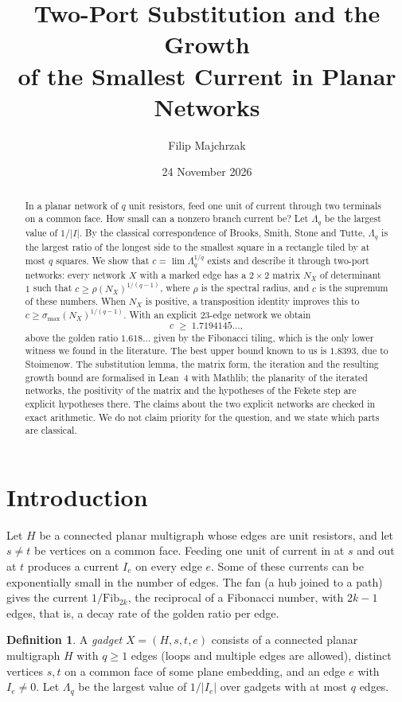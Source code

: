 \documentclass[11pt]{amsart}
\title[Two-port substitution and the smallest current in planar networks]{Two-Port Substitution and the Growth\\ of the Smallest Current in Planar Networks}
\author{Filip Majchrzak}
\date{24 November 2026}
\theoremstyle{plain}
\theoremstyle{definition}
\newtheorem{definition}{Definition}
\theoremstyle{remark}
\newcommand{\Lam}{\Lambda}
\begin{document}
\begin{abstract}
In a planar network of $q$ unit resistors, feed one unit of current through two terminals on a common face. How
small can a nonzero branch current be? Let $\Lam_q$ be the largest value of $1/|I|$. By the classical
correspondence of Brooks, Smith, Stone and Tutte, $\Lam_q$ is the largest ratio of the longest side to the
smallest square in a rectangle tiled by at most $q$ squares. We show that $c=\lim\Lam_q^{1/q}$ exists and describe
it through two-port networks: every network $X$ with a marked edge has a $2\times2$ matrix $N_X$ of determinant~$1$
such that $c\ge\rho(N_X)^{1/(q-1)}$, where $\rho$ is the spectral radius, and $c$ is the supremum of these numbers.
When $N_X$ is positive, a transposition identity improves this to $c\ge\sigma_{\max}(N_X)^{1/(q-1)}$. With an explicit $23$-edge network we
obtain
\[
 c\;\ge\;1.7194145\ldots,
\]
above the golden ratio $1.618\ldots$ given by the Fibonacci tiling, which is the only lower witness we found in the
literature. The best upper bound known to us is $1.8393$, due to Stoimenow. The substitution lemma, the matrix
form, the iteration and the resulting growth bound are formalised in Lean~4 with Mathlib; the planarity of the
iterated networks, the positivity of the matrix and the hypotheses of the Fekete step are explicit hypotheses
there. The claims about the two explicit networks are checked in exact arithmetic. We do not
claim priority for the question, and we state which parts are classical.
\end{abstract}

\maketitle

\section{Introduction}

Let $H$ be a connected planar multigraph whose edges are unit resistors, and let $s\ne t$ be vertices on a common
face. Feeding one unit of current in at $s$ and out at $t$ produces a current $I_e$ on every edge $e$. Some of
these currents can be exponentially small in the number of edges. The fan (a hub joined to a path) gives the
current $1/\mathrm{Fib}_{2k}$, the reciprocal of a Fibonacci number, with $2k-1$ edges, that is, a decay rate of
the golden ratio per edge.

\begin{definition}
A \emph{gadget} $X=(H,s,t,e)$ consists of a connected planar multigraph $H$ with $q\ge1$ edges (loops and
multiple edges are allowed), distinct vertices
$s,t$ on a common face of some plane embedding, and an edge $e$ with $I_e\ne0$. Let $\Lam_q$ be the largest value
of $1/|I_e|$ over gadgets with at most $q$ edges.
\end{definition}
\end{document}
